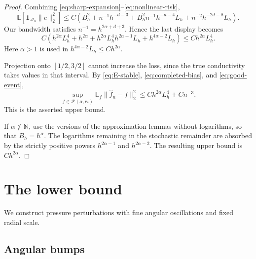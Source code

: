 \documentclass[11pt]{article}
\theoremstyle{remark}
\newcommand{\E}{\mathbb E}
\newcommand{\one}{\mathbf 1}
\newcommand{\cF}{\mathcal F}
\begin{document}
\begin{proof}
Combining \eqref{eq:sharp-expansion}--\eqref{eq:nonlinear-risk},
\[
\E[\one_{\mathcal A_h}\|e\|_2^2]
\leq C\left(
B_h^2+n^{-1}h^{-d-3}
+B_h^2n^{-1}h^{-d-4}L_h
+n^{-2}h^{-2d-8}L_h
\right).
\]
Our bandwidth satisfies \(n^{-1}=h^{2\alpha+d+3}\). Hence the last
display becomes
\[
C\left(
h^{2\alpha}L_h^4+h^{2\alpha}
+h^{2\alpha}L_h^4 h^{2\alpha-1}L_h
+h^{4\alpha-2}L_h
\right)
\leq Ch^{2\alpha}L_h^4.
\]
Here \(\alpha>1\) is used in
\(h^{4\alpha-2}L_h\leq Ch^{2\alpha}\).

Projection onto \([1/2,3/2]\) cannot increase the loss, since the
true conductivity takes values in that interval. By
\eqref{eq:E-stable}, \eqref{eq:completed-bias}, and
\eqref{eq:good-event},
\[
\sup_{f\in\cF(\alpha,r_*)}
\E_f\|\widehat f_n-f\|_2^2
\leq Ch^{2\alpha}L_h^4+Cn^{-3}.
\]
This is the asserted upper bound.

If \(\alpha\notin\mathbb N\), use the versions of the approximation
lemmas without logarithms, so that \(B_h=h^\alpha\).
The logarithms remaining in the stochastic remainder are absorbed
by the strictly positive powers \(h^{2\alpha-1}\) and
\(h^{2\alpha-2}\). The resulting upper bound is \(Ch^{2\alpha}\).
\end{proof}

\section{The lower bound}


We construct pressure perturbations with fine angular oscillations
and fixed radial scale.

\subsection{Angular bumps}
\end{document}
